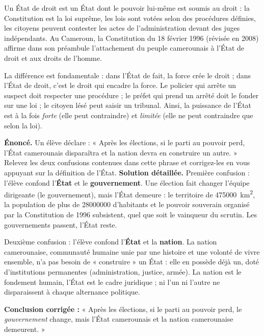 \documentclass[11pt]{article}
\newcommand{\cle}[1]{{\popxbold\color{popdark}#1}}
\begin{document}
\begin{definition}
Un \cle{État de droit} est un État dont le pouvoir lui-même est soumis au \cle{droit} : la Constitution est la loi suprême, les lois sont votées selon des procédures définies, les citoyens peuvent contester les actes de l'administration devant des juges indépendants. Au Cameroun, la Constitution du 18 février 1996 (révisée en 2008) affirme dans son préambule l'attachement du peuple camerounais à l'État de droit et aux droits de l'homme.
\end{definition}

La différence est fondamentale : dans l'État de fait, la force crée le droit ; dans l'État de droit, c'est le droit qui encadre la force. Le policier qui arrête un suspect doit respecter une procédure ; le préfet qui prend un arrêté doit le fonder sur une loi ; le citoyen lésé peut saisir un tribunal. Ainsi, la puissance de l'État est à la fois \emph{forte} (elle peut contraindre) et \emph{limitée} (elle ne peut contraindre que selon la loi).

\begin{exoresolu}
\textbf{Énoncé.} Un élève déclare : « Après les élections, si le parti au pouvoir perd, l'État camerounais disparaîtra et la nation devra en construire un autre. » Relevez les deux confusions contenues dans cette phrase et corrigez-les en vous appuyant sur la définition de l'État.
\tcblower
\textbf{Solution détaillée.}
Première confusion : l'élève confond l'\textbf{État} et le \textbf{gouvernement}. Une élection fait changer l'équipe dirigeante (le gouvernement), mais l'État demeure : le territoire de \SI{475000}{km^2}, la population de plus de \num{28000000} d'habitants et le pouvoir souverain organisé par la Constitution de 1996 subsistent, quel que soit le vainqueur du scrutin. Les gouvernements passent, l'État reste.

Deuxième confusion : l'élève confond l'\textbf{État} et la \textbf{nation}. La nation camerounaise, communauté humaine unie par une histoire et une volonté de vivre ensemble, n'a pas besoin de « construire » un État : elle en possède déjà un, doté d'institutions permanentes (administration, justice, armée). La nation est le fondement humain, l'État est le cadre juridique ; ni l'un ni l'autre ne disparaissent à chaque alternance politique.

\textbf{Conclusion corrigée :} « Après les élections, si le parti au pouvoir perd, le \emph{gouvernement} change, mais l'État camerounais et la nation camerounaise demeurent. »
\end{exoresolu}
\end{document}
